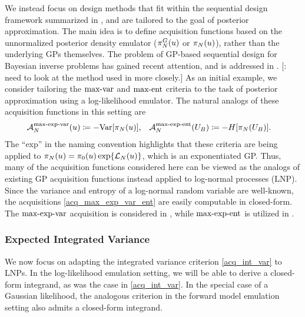 \documentclass[12pt]{article}
\begin{document}
We instead focus on design methods that fit within the sequential design framework summarized in , and 
are tailored to the goal of posterior approximation. The main idea is to define acquisition functions based on 
the unnormalized posterior density emulator ($\fwdEmRdm[\Ndesign]{\postDens}(\Par)$ or $\llikEmRdmDens[\Ndesign](\Par)$), 
rather than the underlying GPs themselves. The problem of GP-based sequential design for Bayesian inverse problems  
has gained recent attention, and is addressed in 
\cite{SinsbeckNowak, Surer2023sequential, VehtariParallelGP, briol2017sampling, ranjan2016inverse, 
	landslideCalibration, KandasamyActiveLearning2015, Kandasamy_2017, wang2018adaptive,   
	weightedIVAR, quantileApprox, hydrologicalModel, briol2017sampling}. 
[\todo: need to look at the method used in \cite{quantileApprox, hydrologicalModel} more closely.]
As an initial example, we consider tailoring the $\maxvarLabel$ and $\maxentLabel$ criteria to the task of posterior approximation 
using a log-likelihood emulator. The natural analogs of these acquisition functions in this setting are 
\begin{align}
&\labelAcq[\Ndesign]{\maxexpvarLabel}(\Par) \Def -\Var[\llikEmRdmDens[\Ndesign](\Par)] , 
&&\labelAcq[\Ndesign]{\maxexpentLabel}(\designBatchIn) \Def -\Ent[\llikEmRdmDens[\Ndesign](\designBatchIn)]. \label{acq_max_exp_var_ent}
\end{align} 
The ``exp'' in the naming convention highlights that these criteria are being applied to
$\llikEmRdmDens[\Ndesign](\Par) = \priorDens(\Par) \Exp{\llikEm(\Par)}$, which is an exponentiated GP. 
Thus, many of the acquisition functions 
considered here can be viewed as the analogs of existing GP acquisition functions instead applied to log-normal 
processes (LNP). Since the 
variance and entropy of a log-normal random variable are well-known, the acquisitions \ref{acq_max_exp_var_ent}
are easily computable in closed-form. The $\maxexpvarLabel$ acquisition is considered in 
\cite{KandasamyActiveLearning2015, Kandasamy_2017}, 
while $\maxexpentLabel$ is utilized in \cite{wang2018adaptive, landslideCalibration}. 

\subsubsection{Expected Integrated Variance}
We now focus on adapting the integrated variance criterion \ref{acq_int_var} to LNPs. 
In the log-likelihood emulation 
setting, we will be able to derive a closed-form integrand, as was the case in \ref{acq_int_var}. In the special case 
of a Gaussian likelihood, the analogous criterion in the forward model emulation setting also admits a closed-form 
integrand. 
\end{document}
